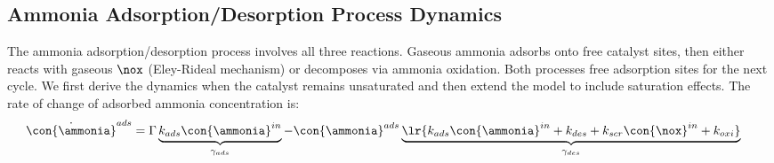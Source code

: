 \subsection{Ammonia Adsorption/Desorption Process Dynamics \label{sec::sigma_deriv}}


The ammonia adsorption/desorption process involves all three reactions. Gaseous ammonia adsorbs onto free catalyst sites,
then either reacts with gaseous $\nox$ (Eley-Rideal mechanism) or decomposes via ammonia oxidation. Both processes free
adsorption sites for the next cycle. We first derive the dynamics when the catalyst remains unsaturated and then extend
the model to include saturation effects. The rate of change of adsorbed ammonia concentration is:
\begin{align}
    \dot{\con{\ammonia}}^{ads} &= \Gamma \underbrace{k_{ads} \con{\ammonia}^{in}}_{\gamma_{ads}}
        - \con{\ammonia}^{ads} \underbrace{\lr{k_{ads} \con{\ammonia}^{in} + k_{des} + k_{scr} \con{\nox}^{in}
        + k_{oxi}}}_{\gamma_{des}}
    \label{eqn::sigma_rate}
\end{align}

